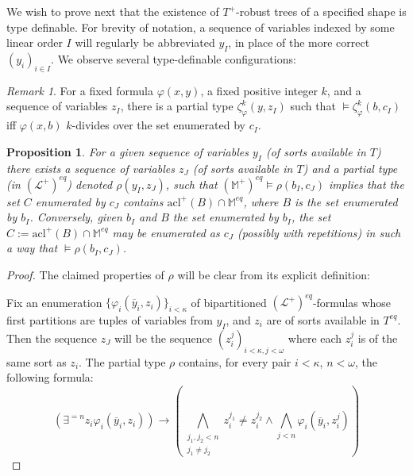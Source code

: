 \documentclass{article}
\newtheorem{prop}[theorem]{Proposition}
\theoremstyle{remark}
\newtheorem{remark}[theorem]{Remark}
\theoremstyle{definition}
\begin{document}
We wish to prove next that the existence of $T^+$-robust trees of a specified shape is type definable. For brevity of notation, a sequence of variables indexed by some linear order $I$ will regularly be abbreviated $y_I$, in place of the more correct $(y_i)_{i\in I}$. We observe several type-definable configurations:

\begin{remark}\label{DivRmk}
    For a fixed formula $\varphi(x,y)$, a fixed positive integer $k$, and a sequence of variables $z_I$, there is a partial type $\zeta_\varphi^k(y,z_I)$ such that $\models \zeta_\varphi^k(b,c_I)$ iff $\varphi(x,b)$ $k$-divides over the set enumerated by $c_I$.
\end{remark}

\begin{prop}\label{ACLProp}
    For a given sequence of variables $y_I$ (of sorts available in $T$) there exists a sequence of variables $z_J$ (of sorts available in $T$) and a partial type (in $(\mathcal{L}^{+})^{eq}$) denoted $\rho(y_I,z_J)$, such that $(\mathbb{M}^+)^{eq}\models \rho(b_I,c_J)$ implies that the set $C$ enumerated by $c_J$ contains $\mathrm{acl}^+(B)\cap\mathbb{M}^{eq}$, where $B$ is the set enumerated by $b_I$. Conversely, given $b_I$ and $B$ the set enumerated by $b_I$, the set $C:=\mathrm{acl}^+(B)\cap\mathbb{M}^{eq}$ may be enumerated as $c_J$ (possibly with repetitions) in such a way that $\models \rho(b_I,c_J)$.
\end{prop}
\begin{proof}
The claimed properties of $\rho$ will be clear from its explicit definition:

Fix an enumeration $\{\varphi_i(\overline{y}_i, z_i)\}_{i<\kappa}$ of bipartitioned $(\mathcal{L}^+)^{eq}$-formulas whose first partitions are tuples of variables from $y_I$, and $z_i$ are of sorts available in $T^{eq}$. Then the sequence $z_J$ will be the sequence $(z_i^j)_{i<\kappa, j<\omega}$ where each $z_i^j$ is of the same sort as $z_i$. The partial type $\rho$ contains, for every pair $i<\kappa$, $n<\omega$, the following formula:
\[(\exists^{=n}z_i\varphi_i(\overline{y}_i,z_i))\rightarrow(\bigwedge_{\substack{j_1,j_2<n\\ j_1\neq j_2}}z_i^{j_1}\neq z_i^{j_2}\land \bigwedge_{j<n}\varphi_i(\overline{y}_i, z_i^j))\]
    
\end{proof}
\end{document}
